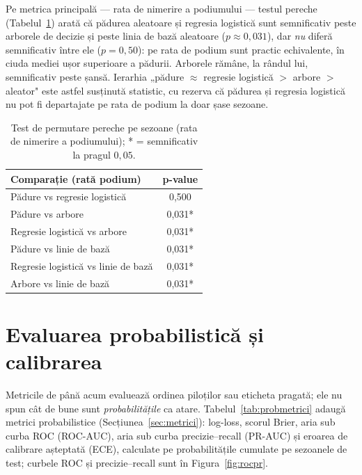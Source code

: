 \documentclass[12pt,a4paper]{report}
\begin{document}
Pe metrica principală --- rata de nimerire a podiumului --- testul pereche
(Tabelul~\ref{tab:semnificatie}) arată că pădurea aleatoare și regresia logistică sunt semnificativ
peste arborele de decizie și peste linia de bază aleatoare ($p \approx 0{,}031$), dar \emph{nu} diferă
semnificativ între ele ($p = 0{,}50$): pe rata de podium sunt practic echivalente, în ciuda mediei
ușor superioare a pădurii. Arborele rămâne, la rândul lui, semnificativ peste șansă. Ierarhia
„pădure $\approx$ regresie logistică $>$ arbore $>$ aleator" este astfel susținută statistic, cu
rezerva că pădurea și regresia logistică nu pot fi departajate pe rata de podium la doar șase sezoane.

\begin{table}[htbp]
  \centering
  \begin{tabular}{l c}
    \toprule
    \textbf{Comparație (rată podium)} & \textbf{p-value} \\
    \midrule
    Pădure vs regresie logistică       & 0,500 \\
    Pădure vs arbore                   & 0,031* \\
    Regresie logistică vs arbore       & 0,031* \\
    Pădure vs linie de bază            & 0,031* \\
    Regresie logistică vs linie de bază & 0,031* \\
    Arbore vs linie de bază            & 0,031* \\
    \bottomrule
  \end{tabular}
  \caption{Test de permutare pereche pe sezoane (rata de nimerire a podiumului); * = semnificativ la
    pragul $0{,}05$.}
  \label{tab:semnificatie}
\end{table}

\section{Evaluarea probabilistică și calibrarea}
\label{sec:rezcalibrare}

Metricile de până acum evaluează ordinea piloților sau eticheta pragată; ele nu spun cât de bune sunt
\emph{probabilitățile} ca atare. Tabelul~\ref{tab:probmetrici} adaugă metrici probabilistice
(Secțiunea~\ref{sec:metrici}): log-loss, scorul Brier, aria sub curba ROC (ROC-AUC), aria sub curba
precizie--recall (PR-AUC) și eroarea de calibrare așteptată (ECE), calculate pe probabilitățile
cumulate pe sezoanele de test; curbele ROC și precizie--recall sunt în Figura~\ref{fig:rocpr}.
\end{document}
